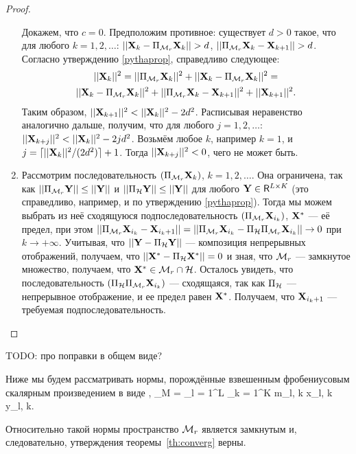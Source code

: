 \documentclass[12pt,a4paper,fleqn,leqno]{article}
\begin{document}
\begin{proof}
\begin{enumerate}
Докажем, что $c = 0$. Предположим противное: существует $d > 0$ такое, что для любого $k = 1, 2, \ldots$: $||\mathbf{X}_k - \Pi_{\mathcal{M}_r} \mathbf{X}_k|| > d$, $||\Pi_{\mathcal{M}_r} \mathbf{X}_k - \mathbf{X}_{k + 1}|| > d$. Согласно утверждению \ref{pythaprop}, справедливо следующее:
\begin{gather*}
||\mathbf{X}_k||^2 = ||\Pi_{\mathcal{M}_r} \mathbf{X}_k||^2 + ||\mathbf{X}_k - \Pi_{\mathcal{M}_r} \mathbf{X}_k||^2 =\\ ||\mathbf{X}_k - \Pi_{\mathcal{M}_r} \mathbf{X}_k||^2 + ||\Pi_{\mathcal{M}_r} \mathbf{X}_k - \mathbf{X}_{k + 1}||^2 + ||\mathbf{X}_{k + 1}||^2.
\end{gather*}
Таким образом, $||\mathbf{X}_{k+1}||^2 < ||\mathbf{X}_k||^2 - 2d^2$. Расписывая неравенство аналогично дальше, получим, что для любого $j = 1, 2, \ldots$: $||\mathbf{X}_{k+j}||^2 < ||\mathbf{X}_k||^2 - 2 j d^2$. Возьмём любое $k$, например $k = 1$, и $j = \lceil ||\mathbf{X}_k||^2 / (2d^2) \rceil + 1$. Тогда $||\mathbf{X}_{k+j}||^2 < 0$, чего не может быть.
\item Рассмотрим последовательность $(\Pi_{\mathcal{M}_r} \mathbf{X}_k)$, $k = 1, 2, \ldots$. Она ограничена, так как $||\Pi_{\mathcal{M}_r} \mathbf{Y}|| \le ||\mathbf{Y}||$ и $||\Pi_{\mathcal{H}} \mathbf{Y}|| \le ||\mathbf{Y}||$ для любого $\mathbf{Y} \in \mathsf{R}^{L \times K}$ (это справедливо, например, и по утверждению \ref{pythaprop}). Тогда мы можем выбрать из неё сходящуюся подпоследовательность $(\Pi_{\mathcal{M}_r} \mathbf{X}_{i_k})$, $\mathbf{X}^*$ --- её предел, при этом $||\Pi_{\mathcal{M}_r} \mathbf{X}_{i_k} - \mathbf{X}_{i_k + 1}|| = ||\Pi_{\mathcal{M}_r} \mathbf{X}_{i_k} - \Pi_{\mathcal{H}} \Pi_{\mathcal{M}_r} \mathbf{X}_{i_k}|| \to 0$ при $k \to + \infty$. Учитывая, что $||\mathbf{Y} - \Pi_{\mathcal{H}} \mathbf{Y}||$ --- композиция непрерывных отображений, получаем, что $||\mathbf{X}^* - \Pi_{\mathcal{H}} \mathbf{X}^*|| = 0$ и зная, что $\mathcal{M}_r$ --- замкнутое множество, получаем, что $\mathbf{X}^* \in \mathcal{M}_r \cap \mathcal{H}$. Осталось увидеть, что последовательность $(\Pi_{\mathcal{H}} \Pi_{\mathcal{M}_r} \mathbf{X}_{i_k})$ --- сходящаяся, так как $\Pi_{\mathcal{H}}$ --- непрерывное отображение, и ее предел равен $\mathbf{X}^*$. Получаем, что $\mathbf{X}_{i_k + 1}$ --- требуемая подпоследовательность.
\end{enumerate}
\end{proof}

TODO: про поправки в общем виде?

Ниже мы будем рассматривать нормы, порождённые взвешенным фробениусовым скалярным произведением в виде
\be
\label{eq:w_inner_prod}
\langle\bfX, \bfY\rangle_M = \sum_{l = 1}^L \sum_{k = 1}^K m_{l, k} x_{l, k} y_{l, k}.
\ee

Относительно такой нормы пространство $\mathcal{M}_r$ является замкнутым и, следовательно, утверждения теоремы~\ref{th:converg} верны.
\end{document}
